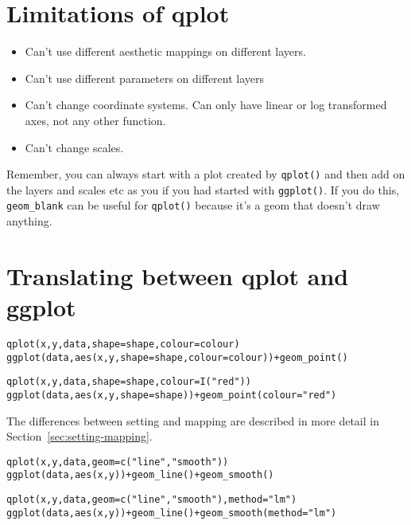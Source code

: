 \section{Limitations of qplot}
\label{sec:qplot-limitations}

\begin{itemize}
  \item Can't use different aesthetic mappings on different layers.  
  \item Can't use different parameters on different layers
  \item Can't change coordinate systems.  Can only have linear or log transformed axes, not any other function.
  \item Can't change scales.
\end{itemize}

Remember, you can always start with a plot created by {\tt qplot()} and then add on the layers and scales etc as you if you had started with {\tt ggplot()}.  If you do this, {\tt geom\_blank} can be useful for {\tt qplot()} because it's a geom that doesn't draw anything.

\section{Translating between qplot and ggplot}
\label{sec:qplot-ggplot}


\begin{alltt}
qplot(x, y, data, shape=shape, colour = colour)
ggplot(data, aes(x, y, shape=shape, colour = colour)) + geom_point()
\end{alltt}

\begin{alltt}
qplot(x, y, data, shape=shape, colour = I("red"))
ggplot(data, aes(x, y, shape=shape)) + geom_point(colour="red")
\end{alltt}

The differences between setting and mapping are described in more detail in Section~\ref{sec:setting-mapping}.

\begin{alltt}
qplot(x, y, data, geom=c("line", "smooth"))
ggplot(data, aes(x, y)) + geom_line() + geom_smooth()
\end{alltt}

\begin{alltt}
qplot(x, y, data, geom=c("line", "smooth"), method="lm")
ggplot(data, aes(x, y)) + geom_line() + geom_smooth(method="lm")
\end{alltt}


